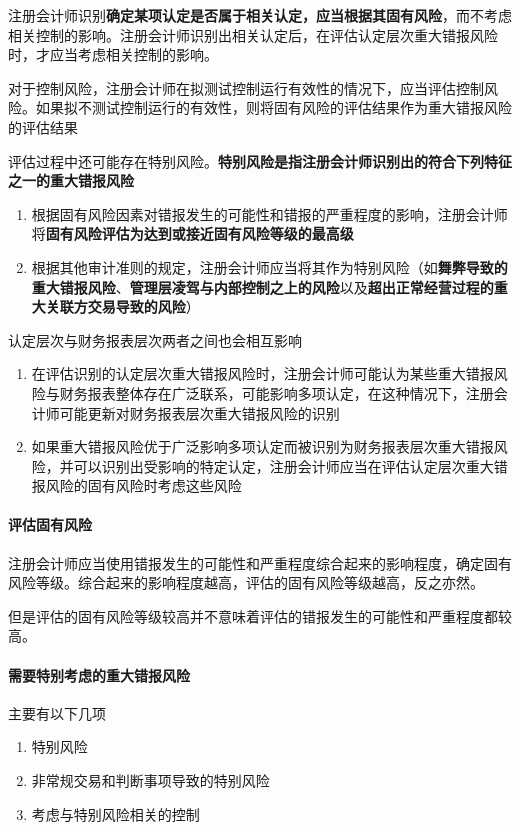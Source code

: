 \documentclass[UTF8,12pt]{ctexart}
\numberwithin{equation}{section} %
\numberwithin{figure}{section}
\numberwithin{table}{section}
\begin{document}
	注册会计师识别\textbf{确定某项认定是否属于相关认定，应当根据其固有风险}，而不考虑相关控制的影响。注册会计师识别出相关认定后，在评估认定层次重大错报风险时，才应当考虑相关控制的影响。
	
	对于控制风险，注册会计师在拟测试控制运行有效性的情况下，应当评估控制风险。如果拟不测试控制运行的有效性，则将固有风险的评估结果作为重大错报风险的评估结果
	
	评估过程中还可能存在特别风险。\textbf{特别风险是指注册会计师识别出的符合下列特征之一的重大错报风险}
	\begin{enumerate}
		\item 根据固有风险因素对错报发生的可能性和错报的严重程度的影响，注册会计师将\textbf{固有风险评估为达到或接近固有风险等级的最高级}
		
		\item 根据其他审计准则的规定，注册会计师应当将其作为特别风险（如\textbf{舞弊导致的重大错报风险}、\textbf{管理层凌驾与内部控制之上的风险}以及\textbf{超出正常经营过程的重大关联方交易导致的风险}）
	\end{enumerate}
	
	认定层次与财务报表层次两者之间也会相互影响
	\begin{enumerate}
		\item 在评估识别的认定层次重大错报风险时，注册会计师可能认为某些重大错报风险与财务报表整体存在广泛联系，可能影响多项认定，在这种情况下，注册会计师可能更新对财务报表层次重大错报风险的识别
		
		\item 如果重大错报风险优于广泛影响多项认定而被识别为财务报表层次重大错报风险，并可以识别出受影响的特定认定，注册会计师应当在评估认定层次重大错报风险的固有风险时考虑这些风险
	\end{enumerate}
	
	\paragraph{评估固有风险}
	注册会计师应当使用错报发生的可能性和严重程度综合起来的影响程度，确定固有风险等级。综合起来的影响程度越高，评估的固有风险等级越高，反之亦然。
	
	但是评估的固有风险等级较高并不意味着评估的错报发生的可能性和严重程度都较高。
	
	\paragraph{需要特别考虑的重大错报风险}
	主要有以下几项
	\begin{enumerate}
		\item 特别风险
		
		\item 非常规交易和判断事项导致的特别风险
		
		\item 考虑与特别风险相关的控制
	\end{enumerate}
	
\end{document}
